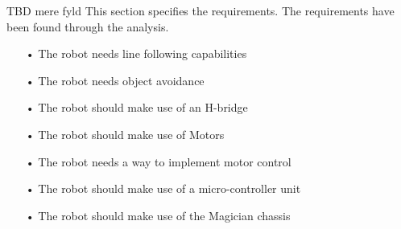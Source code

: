 TBD mere fyld
This section specifies the requirements. The requirements have been found through the analysis.

\cite{ucn}
\begin{enumerate}
	\item[•]The robot needs line following capabilities
	\item[•]The robot needs object avoidance
	\item[•]The robot should make use of an H-bridge
	\item[•]The robot should make use of Motors
	\item[•]The robot needs a way to implement motor control
	\item[•]The robot should make use of a micro-controller unit
	\item[•]The robot should make use of the Magician chassis
\end{enumerate}

